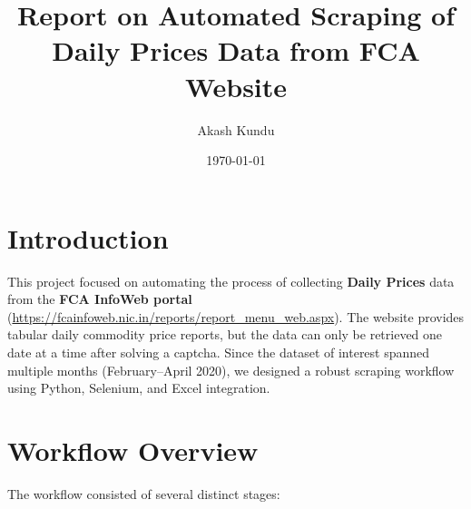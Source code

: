 \documentclass[12pt]{article}
\begin{document}
\title{Report on Automated Scraping of Daily Prices Data from FCA Website}
\author{Akash Kundu}
\date{\today}

\maketitle

\section*{Introduction}
This project focused on automating the process of collecting \textbf{Daily Prices} data 
from the \textbf{FCA InfoWeb portal} 
(\url{https://fcainfoweb.nic.in/reports/report_menu_web.aspx}).  
The website provides tabular daily commodity price reports, but the data can only be 
retrieved one date at a time after solving a captcha.  
Since the dataset of interest spanned multiple months (February--April 2020), 
we designed a robust scraping workflow using Python, Selenium, and Excel integration.

\section*{Workflow Overview}
The workflow consisted of several distinct stages:
\end{document}
